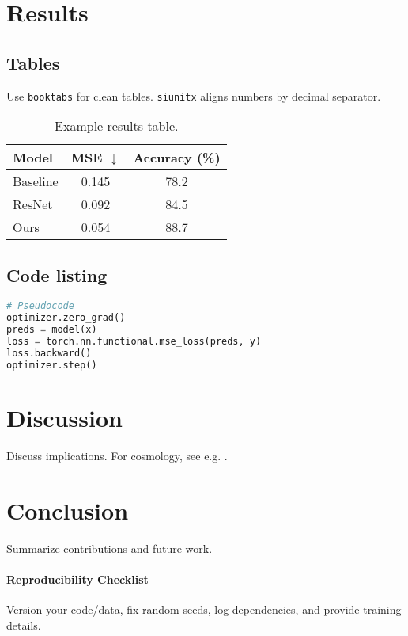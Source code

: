 \documentclass[11pt,a4paper]{article}
\numberwithin{equation}{section}
\begin{document}
\section{Results}
\label{sec:results}

\subsection{Tables}
Use \texttt{booktabs} for clean tables. \texttt{siunitx} aligns numbers by decimal separator.
\begin{table}[H]
  \centering
  \caption{Example results table.}
  \label{tab:results}
  \begin{tabular}{l S[table-format=1.3] S[table-format=1.3]}
    \toprule
    {Model} & {MSE $\downarrow$} & {Accuracy (\%)} \\
    \midrule
    Baseline  & 0.145 & 78.2 \\
    ResNet    & 0.092 & 84.5 \\
    Ours      & 0.054 & 88.7 \\
    \bottomrule
  \end{tabular}
\end{table}

\subsection{Code listing}
\begin{lstlisting}[language=Python,caption={PyTorch-style training step.}]
# Pseudocode
optimizer.zero_grad()
preds = model(x)
loss = torch.nn.functional.mse_loss(preds, y)
loss.backward()
optimizer.step()
\end{lstlisting}

\section{Discussion}
Discuss implications. For cosmology, see e.g. \citep{planck2018parameters,camb}.

\section{Conclusion}
Summarize contributions and future work.

\paragraph{Reproducibility Checklist}
Version your code/data, fix random seeds, log dependencies, and provide training details.
\end{document}
